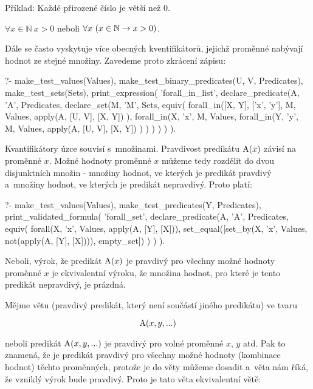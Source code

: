 Příklad: Každé přirozené číslo je větší než 0. 

\(\forall x \in \mathbb{N} \ x > 0\) neboli \(\forall x \ (x \in \mathbb{N} \rightarrow x > 0)\).

Dále se často vyskytuje více obecných kventifikátorů, jejichž proměnné nabývají hodnot ze stejné množiny. Zavedeme proto zkrácení zápisu:

\begin{prolog}
?- 	make_test_values(Values),
	make_test_binary_predicates(U, V, Predicates),
	make_test_sets(Sets),
	print_expression(
		'forall_in_list',
		declare_predicate(A, 'A', Predicates,
			declare_set(M, 'M', Sets,
				equiv(
					forall_in([X, Y], ['x', 'y'], M, Values, 
						apply(A, [U, V], [X, Y])
					),
					forall_in(X, 'x', M, Values, 
						forall_in(Y, 'y', M, Values, 
							apply(A, [U, V], [X, Y])
						)
					)
				)
			)
		)
	).
\end{prolog}

Kvantifikátory úzce souvisí s~množinami. Pravdivost predikátu \(\mathrm{A}(x)\) závisí na proměnné \(x\). Možné hodnoty
proměnné \(x\) můžeme tedy rozdělit do dvou disjunktních množin - množiny hodnot, ve kterých je predikát pravdivý a~množiny hodnot, ve kterých je predikát nepravdivý. Proto platí:

\begin{prolog}
?- 	make_test_values(Values),
	make_test_predicates(Y, Predicates),
	print_validated_formula(
		'forall_set',
		declare_predicate(A, 'A', Predicates,
			equiv(
				forall(X, 'x', Values, apply(A, [Y], [X])),
				set_equal([set_by(X, 'x', Values, not(apply(A, [Y], [X]))), empty_set])
			)
		)
	).
\end{prolog}

Neboli, výrok, že predikát \(\mathrm{A}(x)\) je pravdivý pro všechny možné hodnoty proměnné \(x\) je ekvivalentní výroku, že množina hodnot, pro které je tento predikát nepravdivý, je prázdná.

Mějme větu (pravdivý predikát, který není součástí jiného predikátu) ve tvaru

\begin{equation}
\mathrm{A}(x, y, ...)
\end{equation}

neboli predikát \(\mathrm{A}(x, y, ...)\) je pravdivý pro volné proměnné \(x\), \(y\) atd. Pak to znamená,
že je predikát pravdivý pro všechny možné hodnoty (kombinace hodnot) těchto proměnných, protože je do věty můžeme dosadit a~věta nám říká, že vzniklý výrok bude pravdivý. Proto je tato věta ekvivalentní větě:

